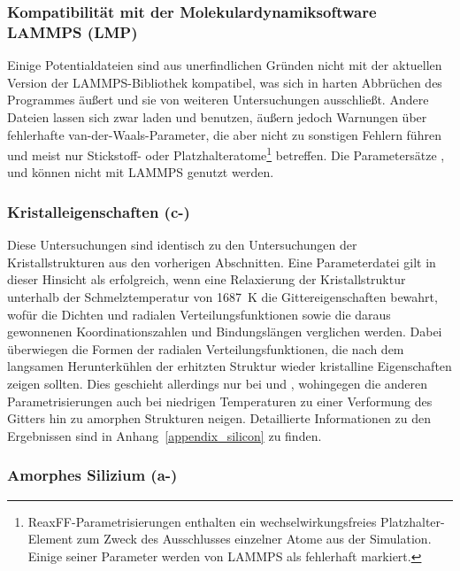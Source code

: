 \subsubsection{Kompatibilität mit der Molekulardynamiksoftware LAMMPS (LMP)}

Einige Potentialdateien sind aus unerfindlichen Gründen nicht mit der aktuellen Version der LAMMPS-Bibliothek kompatibel, was sich in harten Abbrüchen des Programmes äußert und sie von weiteren Untersuchungen ausschließt.
Andere Dateien lassen sich zwar laden und benutzen, äußern jedoch Warnungen über fehlerhafte van-der-Waals-Parameter, die aber nicht zu sonstigen Fehlern führen und meist nur Stickstoff- oder Platzhalteratome\footnote{ReaxFF-Parametrisierungen enthalten ein wechselwirkungsfreies Platzhalter-Element  zum Zweck des Ausschlusses einzelner Atome aus der Simulation. Einige seiner Parameter werden von LAMMPS als fehlerhaft markiert.} betreffen.
Die Parametersätze ,  und  können nicht mit LAMMPS genutzt werden.

\subsubsection{Kristalleigenschaften (c-)}

Diese Untersuchungen sind identisch zu den Untersuchungen der Kristallstrukturen aus den vorherigen Abschnitten.
Eine Parameterdatei gilt in dieser Hinsicht als erfolgreich, wenn eine Relaxierung der Kristallstruktur unterhalb der Schmelztemperatur von \SI{1687}{\kelvin}\cite{haynes_crc_2011} die Gittereigenschaften bewahrt, wofür die Dichten und radialen Verteilungsfunktionen sowie die daraus gewonnenen Koordinationszahlen und Bindungslängen verglichen werden.
Dabei überwiegen die Formen der radialen Verteilungsfunktionen, die nach dem langsamen Herunterkühlen der erhitzten Struktur wieder kristalline Eigenschaften zeigen sollten.
Dies geschieht allerdings nur bei  und , wohingegen die anderen Parametrisierungen auch bei niedrigen Temperaturen zu einer Verformung des Gitters hin zu amorphen Strukturen neigen.
Detaillierte Informationen zu den Ergebnissen sind in Anhang~\ref{appendix_silicon} zu finden.

\subsubsection{Amorphes Silizium (a-)}


